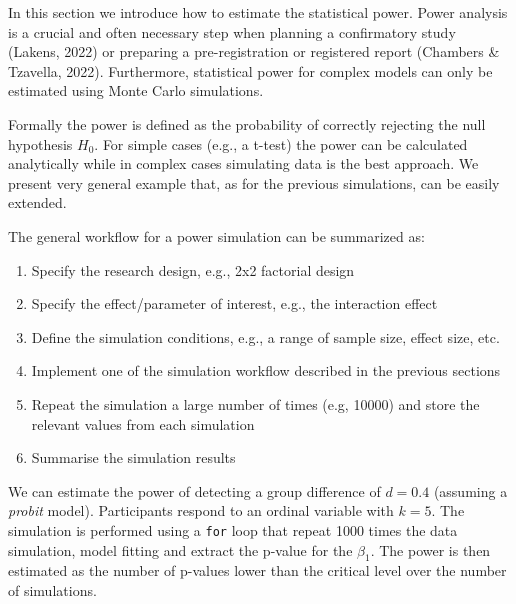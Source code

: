 \documentclass[
  man,floatsintext]{apa6}
\providecommand{\tightlist}{%
  \setlength{\itemsep}{0pt}\setlength{\parskip}{0pt}}
\begin{document}
In this section we introduce how to estimate the statistical power. Power analysis is a crucial and often necessary step when planning a confirmatory study (Lakens, 2022) or preparing a pre-registration or registered report (Chambers \& Tzavella, 2022). Furthermore, statistical power for complex models can only be estimated using Monte Carlo simulations.

Formally the power is defined as the probability of correctly rejecting the null hypothesis \(H_0\). For simple cases (e.g., a t-test) the power can be calculated analytically while in complex cases simulating data is the best approach. We present very general example that, as for the previous simulations, can be easily extended.

The general workflow for a power simulation can be summarized as:

\begin{enumerate}
\def\labelenumi{\arabic{enumi}.}
\tightlist
\item
  Specify the research design, e.g., 2x2 factorial design
\item
  Specify the effect/parameter of interest, e.g., the interaction effect
\item
  Define the simulation conditions, e.g., a range of sample size, effect size, etc.
\item
  Implement one of the simulation workflow described in the previous sections
\item
  Repeat the simulation a large number of times (e.g, 10000) and store the relevant values from each simulation
\item
  Summarise the simulation results
\end{enumerate}

We can estimate the power of detecting a group difference of \(d = 0.4\) (assuming a \emph{probit} model). Participants respond to an ordinal variable with \(k = 5\). The simulation is performed using a \texttt{for} loop that repeat 1000 times the data simulation, model fitting and extract the p-value for the \(\beta_1\). The power is then estimated as the number of p-values lower than the critical level over the number of simulations.

\scriptsize
\end{document}
